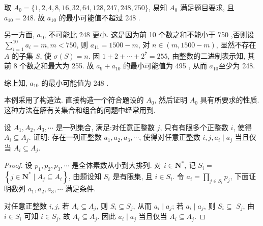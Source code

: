 \begin{solution}
	取 $A_{0}=\{1,2,4,8,16,32,64,128,247,248,750\}$, 易知 $A_{0}$ 满足题目要求, 且 $a_{10}=248$. 故 $a_{10}$ 的最小可能值不超过 248 .

	另一方面, $a_{10}$ 不可能比 248 更小. 这是因为前 10 个数之和不能小于 750 ,否则设 $\sum_{i=1}^{10} a_{i}=m, m<750$, 则 $a_{11}=1500-m$, 对 $n \in(m, 1500-m)$, 显然不存在 $A$ 的子集 $S$, 使 $\sigma(S)=n$. 因 $1+2+\cdots+2^{7}=255$, 由整数的二进制表示知, 其前 8 个数之和最大为 255. 故 $a_{9}+a_{10}$ 的最小可能值为 495 , 从而 $a_{10}$至少为 248.

	综上知, $a_{10}$ 的最小可能值为 248 .
\end{solution}

\begin{note}
	本例采用了构造法. 直接构造一个符合题设的 $A_{0}$, 然后证明 $A_{0}$ 具有所要求的性质. 这种方法在解有关集合和组合的问题中经常用到.
\end{note}

\begin{example}
	设 $A_{1}, A_{2}, A_{3}, \cdots$ 是一列集合, 满足:对任意正整数 $j$, 只有有限多个正整数 $i$, 使得 $A_{i} \subseteq A_{j}$. 证明: 存在一列正整数 $a_{1}, a_{2}, a_{3}, \cdots$, 使得对任意正整数 $i ,  j, a_{i} \mid a_{j}$ 当且仅当 $A_{i} \subseteq A_{j}$.
\end{example}
\begin{proof}
	设 $p_{1}, p_{2}, p_{3}, \cdots$ 是全体素数从小到大排列. 对 $i \in \mathbf{N}^{*}$, 记 $S_{i}=$ $\left\{j \in \mathbf{N}^{*} \mid A_{j} \subseteq A_{i}\right\}$, 由题设知 $S_{i}$ 是有限集, 且 $i \in S_{i}$. 令 $a_{i}=\prod_{j \in S_{i}} p_{j}$, 下面证明数列 $a_{1}, a_{2}, a_{3}, \cdots$ 满足条件.

	对任意正整数 $i ,  j$, 若 $A_{i} \subseteq A_{j}$, 则 $S_{i} \subseteq S_{j}$, 从而 $a_{i} \mid a_{j}$; 若 $a_{i} \mid a_{j}$, 则 $S_{i} \subseteq$ $S_{j}$, 由 $i \in S_{i}$ 可知 $i \in S_{j}$, 故 $A_{i} \subseteq A_{j}$. 因此 $a_{i} \mid a_{j}$ 当且仅当 $A_{i} \subseteq A_{j}$.
\end{proof}

